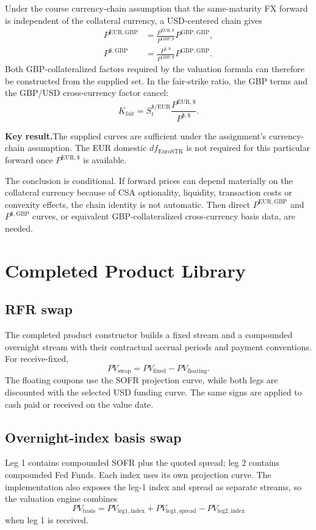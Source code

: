 \documentclass[11pt]{article}
\newcommand{\keynote}[1]{\par\medskip\noindent\textbf{\sffamily\color{NYUviolet}Key result.}\enspace #1\par\medskip}
\numberwithin{equation}{section}
\begin{document}
Under the course currency-chain assumption that the same-maturity FX forward
is independent of the collateral currency, a USD-centered chain gives
\begin{align}
P^{\mathrm{EUR},\mathrm{GBP}}
&=\boxed{\frac{P^{\mathrm{EUR},\$}}{P^{\mathrm{GBP},\$}}
P^{\mathrm{GBP},\mathrm{GBP}}},\\
P^{\$,\mathrm{GBP}}
&=\boxed{\frac{P^{\$,\$}}{P^{\mathrm{GBP},\$}}
P^{\mathrm{GBP},\mathrm{GBP}}}.
\end{align}
Both GBP-collateralized factors required by the valuation formula can therefore
be constructed from the supplied set. In the fair-strike ratio, the GBP terms
and the GBP/USD cross-currency factor cancel:
\begin{equation}
\boxed{
K_{\mathrm{fair}}
=S_t^{\$/\mathrm{EUR}}
\frac{P^{\mathrm{EUR},\$}}{P^{\$,\$}}.}
\end{equation}

\keynote{The supplied curves are sufficient under the assignment's currency-chain assumption. The EUR domestic $df_{\mathrm{EuroSTR}}$ is not required for this particular forward once $P^{\mathrm{EUR},\$}$ is available.}

The conclusion is conditional. If forward prices can depend materially on the
collateral currency because of CSA optionality, liquidity, transaction costs or
convexity effects, the chain identity is not automatic. Then direct
$P^{\mathrm{EUR},\mathrm{GBP}}$ and $P^{\$,\mathrm{GBP}}$ curves, or equivalent
GBP-collateralized cross-currency basis data, are needed.

\section{Completed Product Library}
\subsection{RFR swap}
The completed product constructor builds a fixed stream and a compounded
overnight stream with their contractual accrual periods and payment
conventions. For receive-fixed,
\begin{equation}
PV_{\mathrm{swap}}=PV_{\mathrm{fixed}}-PV_{\mathrm{floating}}.
\end{equation}
The floating coupons use the SOFR projection curve, while both legs are
discounted with the selected USD funding curve. The same signs are applied to
cash paid or received on the value date.

\subsection{Overnight-index basis swap}
Leg 1 contains compounded SOFR plus the quoted spread; leg 2 contains
compounded Fed Funds. Each index uses its own projection curve. The
implementation also exposes the leg-1 index and spread as separate streams,
so the valuation engine combines
\begin{equation}
PV_{\mathrm{basis}}
=PV_{\mathrm{leg1,index}}+PV_{\mathrm{leg1,spread}}
-PV_{\mathrm{leg2,index}}
\end{equation}
when leg 1 is received.
\end{document}
